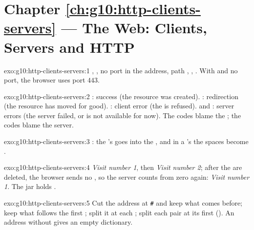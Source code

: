 \section*{Chapter \ref{ch:g10:http-clients-servers} --- The Web: Clients, Servers and HTTP}

\begin{solution}{exo:g10:http-clients-servers:1}
 ,  , no port in the address, path , 
,  . With  and no port, the browser uses port $443$.
\end{solution}

\begin{solution}{exo:g10:http-clients-servers:2}
: success (the resource was created). : redirection (the resource has moved for good).
: client error (the  is refused).  and : server errors (the server failed, or
is not available for now). The  codes blame the ; the  codes blame the server.
\end{solution}

\begin{solution}{exo:g10:http-clients-servers:3}
: the 's  goes into the , and in a 's
 the spaces become \code{+}.
\end{solution}

\begin{solution}{exo:g10:http-clients-servers:4}
\textit{Visit number 1}, then \textit{Visit number 2}; after the  are deleted, the browser sends no , so
the server counts from zero again: \textit{Visit number 1}. The jar holds .
\end{solution}

\begin{solution}{exo:g10:http-clients-servers:5}
Cut the address at \texttt{\#} and keep what comes before; keep what follows the first ; split it at each
\code{&}; split each pair at its first \code{=} (). An address without  gives
an empty dictionary.
\end{solution}

